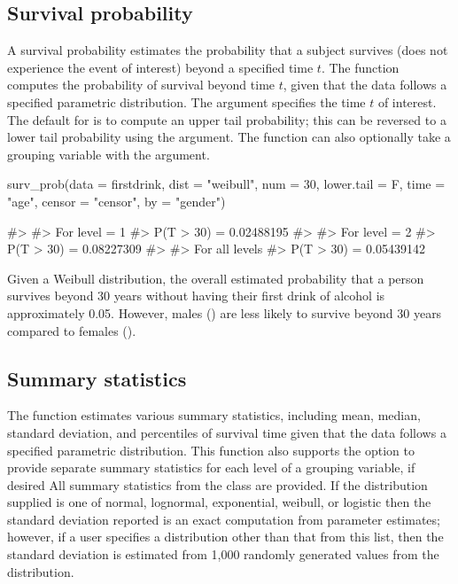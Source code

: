\hypertarget{survival-probability}{%
\subsection{Survival probability}\label{survival-probability}}

A survival probability estimates the probability that a subject survives
(does not experience the event of interest) beyond a specified time
\(t\). The function  computes the probability of
survival beyond time \(t\), given that the data follows a specified
parametric distribution. The  argument specifies the time
\(t\) of interest. The default for  is to compute an
upper tail probability; this can be reversed to a lower tail probability
using the  argument. The function can also optionally
take a grouping variable with the  argument.

\begin{Schunk}
\begin{Sinput}
surv_prob(data = firstdrink, dist = "weibull", num = 30, lower.tail = F, time = "age", censor = "censor", by = "gender")
\end{Sinput}
\begin{Soutput}
#> 
#> For level = 1 
#> P(T > 30) = 0.02488195
#> 
#> For level = 2 
#> P(T > 30) = 0.08227309
#> 
#> For all levels
#> P(T > 30) = 0.05439142
\end{Soutput}
\end{Schunk}

Given a Weibull distribution, the overall estimated probability that a
person survives beyond 30 years without having their first drink of
alcohol is approximately 0.05. However, males () are
less likely to survive beyond 30 years compared to females
().

\hypertarget{summary-statistics}{%
\subsection{Summary statistics}\label{summary-statistics}}

The  function estimates various summary statistics,
including mean, median, standard deviation, and percentiles of survival
time given that the data follows a specified parametric distribution.
This function also supports the option to provide separate summary
statistics for each level of a grouping variable, if desired All summary
statistics from the class  are provided. If the
distribution supplied is one of normal, lognormal, exponential, weibull,
or logistic then the standard deviation reported is an exact computation
from parameter estimates; however, if a user specifies a distribution
other than that from this list, then the standard deviation is estimated
from 1,000 randomly generated values from the distribution.

